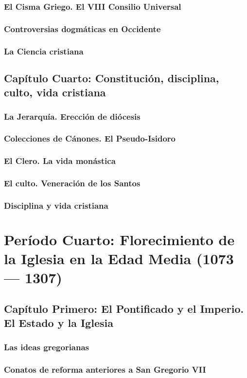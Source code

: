 \raggedbottom{} \documentclass[12pt, a4paper]{book}
\begin{document}
\section{El Cisma Griego. El VIII Consilio Universal}
\section{Controversias dogmáticas en Occidente}
\section{La Ciencia cristiana}
\chapter{Capítulo Cuarto: Constitución, disciplina, culto, vida cristiana}
\section{La Jerarquía. Erección de diócesis}
\section{Colecciones de Cánones. El Pseudo-Isidoro}
\section{El Clero. La vida monástica}
\section{El culto. Veneración de los Santos}
\section{Disciplina y vida cristiana}
\part{Período Cuarto: Florecimiento de la Iglesia en la Edad Media (1073 --- 1307)}
\chapter{Capítulo Primero: El Pontificado y el Imperio. El Estado y la Iglesia}
\section{Las ideas gregorianas}
\section{Conatos de reforma anteriores a San Gregorio VII}
\end{document}
